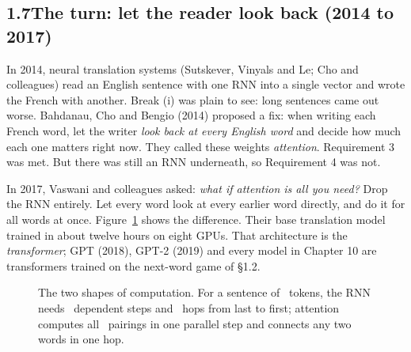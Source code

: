 
\subsection*{1.7\quad The turn: let the reader look back (2014 to 2017)}

In 2014, neural translation systems (Sutskever, Vinyals and Le; Cho and colleagues) read an English sentence
with one RNN into a single vector and wrote the French with another. Break (i) was plain to see: long sentences
came out worse. Bahdanau, Cho and Bengio (2014) proposed a fix: when writing each French word, let the writer
\emph{look back at every English word} and decide how much each one matters right now. They called these weights
\emph{attention}. Requirement 3 was met. But there was still an RNN underneath, so Requirement 4 was not.

In 2017, Vaswani and colleagues asked: \emph{what if attention is all you need?} Drop the RNN entirely. Let every
word look at every earlier word directly, and do it for all words at once. Figure~\ref{fig:rnn-vs-attn} shows
the difference. Their base translation model trained in about twelve hours on eight GPUs. That architecture is
the \emph{transformer}; GPT (2018), GPT-2 (2019) and every model in Chapter 10 are transformers trained on the
next-word game of \S1.2.

\begin{figure}[h]
\centering
{}
\caption{The two shapes of computation. For a sentence of \hT\ tokens, the RNN needs \hT\ dependent steps and
\hHops\ hops from last to first; attention computes all \hTT\ pairings in one parallel step and connects any two
words in one hop.}
\label{fig:rnn-vs-attn}
\end{figure}

